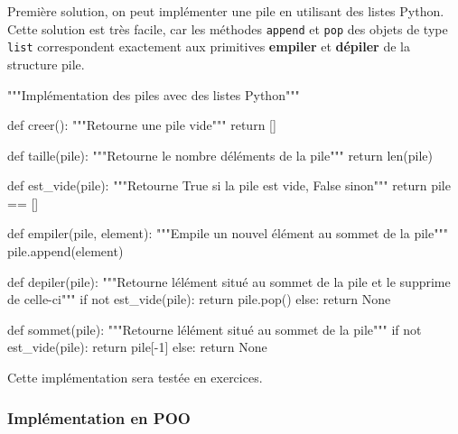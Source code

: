 \documentclass[
  a4paper,
  DIV=11,
  numbers=noendperiod]{scrartcl}
\newenvironment{Shaded}{\begin{snugshade}}{\end{snugshade}}
\newcommand{\BuiltInTok}[1]{\textcolor[rgb]{0.00,0.23,0.31}{#1}}
\newcommand{\CommentTok}[1]{\textcolor[rgb]{0.37,0.37,0.37}{#1}}
\newcommand{\ControlFlowTok}[1]{\textcolor[rgb]{0.00,0.23,0.31}{#1}}
\newcommand{\DecValTok}[1]{\textcolor[rgb]{0.68,0.00,0.00}{#1}}
\newcommand{\KeywordTok}[1]{\textcolor[rgb]{0.00,0.23,0.31}{#1}}
\newcommand{\NormalTok}[1]{\textcolor[rgb]{0.00,0.23,0.31}{#1}}
\newcommand{\OperatorTok}[1]{\textcolor[rgb]{0.37,0.37,0.37}{#1}}
\newcommand{\VariableTok}[1]{\textcolor[rgb]{0.07,0.07,0.07}{#1}}
\begin{document}
Première solution, on peut implémenter une pile en utilisant des listes
Python. Cette solution est très facile, car les méthodes \texttt{append}
et \texttt{pop} des objets de type \texttt{list} correspondent
exactement aux primitives \textbf{empiler} et \textbf{dépiler} de la
structure pile.

\begin{Shaded}
\begin{Highlighting}[]
\CommentTok{"""Implémentation des piles avec des listes Python"""}


\KeywordTok{def}\NormalTok{ creer():}
    \CommentTok{"""Retourne une pile vide"""}
    \ControlFlowTok{return}\NormalTok{ []}


\KeywordTok{def}\NormalTok{ taille(pile):}
    \CommentTok{"""Retourne le nombre d\textquotesingle{}éléments de la pile"""}
    \ControlFlowTok{return} \BuiltInTok{len}\NormalTok{(pile)}


\KeywordTok{def}\NormalTok{ est\_vide(pile):}
    \CommentTok{"""Retourne True si la pile est vide, False sinon"""}
    \ControlFlowTok{return}\NormalTok{ pile }\OperatorTok{==}\NormalTok{ []}


\KeywordTok{def}\NormalTok{ empiler(pile, element):}
    \CommentTok{"""Empile un nouvel élément au sommet de la pile"""}
\NormalTok{    pile.append(element)}


\KeywordTok{def}\NormalTok{ depiler(pile):}
    \CommentTok{"""Retourne l\textquotesingle{}élément situé au sommet de la pile}
\CommentTok{    et le supprime de celle{-}ci"""}
    \ControlFlowTok{if} \KeywordTok{not}\NormalTok{ est\_vide(pile):}
        \ControlFlowTok{return}\NormalTok{ pile.pop()}
    \ControlFlowTok{else}\NormalTok{:}
        \ControlFlowTok{return} \VariableTok{None}


\KeywordTok{def}\NormalTok{ sommet(pile):}
    \CommentTok{"""Retourne l\textquotesingle{}élément situé au sommet de la pile"""}
    \ControlFlowTok{if} \KeywordTok{not}\NormalTok{ est\_vide(pile):}
        \ControlFlowTok{return}\NormalTok{ pile[}\OperatorTok{{-}}\DecValTok{1}\NormalTok{]}
    \ControlFlowTok{else}\NormalTok{:}
        \ControlFlowTok{return} \VariableTok{None}
\end{Highlighting}
\end{Shaded}

Cette implémentation sera testée en exercices.

\hypertarget{impluxe9mentation-en-poo}{%
\subsubsection{Implémentation en POO}\label{impluxe9mentation-en-poo}}
\end{document}
